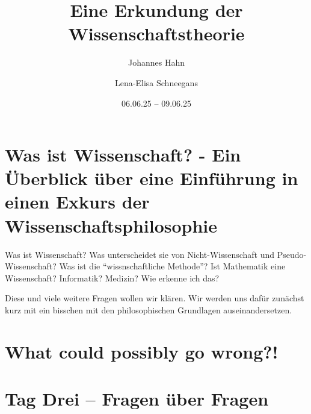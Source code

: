 \documentclass[fontsize=11pt,fleqn,a4paper]{scrartcl}
\author{Johannes Hahn \and Lena-Elisa Schneegans}
\title{Eine Erkundung der Wissenschaftstheorie}
\date{06.06.25 -- 09.06.25}
\begin{document}
\maketitle

\tableofcontents
\pagebreak


\section{Was ist Wissenschaft? - Ein Überblick über eine Einführung in einen Exkurs der Wissenschaftsphilosophie}


Was ist Wissenschaft? Was unterscheidet sie von Nicht-Wissenschaft und Pseudo-Wissenschaft? Was ist die
\enquote{wissnschaftliche Methode}? Ist Mathematik eine Wissenschaft? Informatik? Medizin? Wie erkenne ich das?

Diese und viele weitere Fragen wollen wir klären. Wir werden uns dafür zunächst kurz mit ein bisschen mit den
philosophischen Grundlagen auseinandersetzen.

\pagebreak


\section{What could possibly go wrong?!}



\pagebreak


\section{Tag Drei -- Fragen über Fragen}

\end{document}
